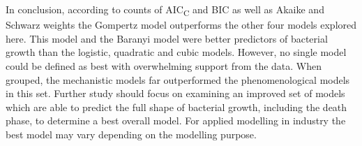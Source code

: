 \documentclass[11pt]{article}
\begin{document}
\begin{linenumbers}
        In conclusion, according to counts of AIC\textsubscript{C} and BIC as well as Akaike and Schwarz weights the Gompertz model outperforms the other four models explored here. This model and the Baranyi model were better predictors of bacterial growth than the logistic, quadratic and cubic models. However, no single model could be defined as best with overwhelming support from the data. When grouped, the mechanistic models far outperformed the phenomenological models in this set. Further study should focus on examining an improved set of models which are able to predict the full shape of bacterial growth, including the death phase, to determine a best overall model. For applied modelling in industry the best model may vary depending on the modelling purpose.

    
    
    
    
    
    \end{linenumbers}
\end{document}
